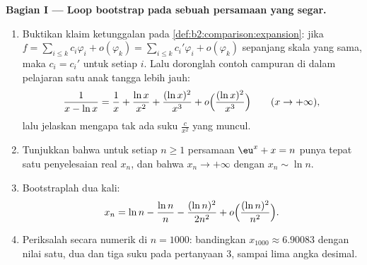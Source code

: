 \begin{problem}
\label{pb:b2:comparison:1}

\medskip
\noindent\textbf{Bagian I --- Loop bootstrap pada sebuah persamaan
yang segar.}
\begin{enumerate}
  \item Buktikan klaim ketunggalan pada
        \cref{def:b2:comparison:expansion}: jika $f = \sum_{i\leq
        k} c_i\varphi_i + o(\varphi_k) = \sum_{i \leq k}
        c_i'\varphi_i + o(\varphi_k)$ sepanjang skala yang sama, maka
        $c_i = c_i'$ untuk setiap $i$. Lalu doronglah contoh campuran
        di dalam pelajaran satu anak tangga lebih jauh:
        \[
        \frac{1}{x - \ln x} = \frac1x + \frac{\ln x}{x^2} +
        \frac{(\ln x)^2}{x^3} + o\Bigl(\frac{(\ln
        x)^2}{x^3}\Bigr) \qquad (x \to +\infty),
        \]
        lalu jelaskan mengapa tak ada suku $\frac{c}{x^2}$ yang muncul.
  \item Tunjukkan bahwa untuk setiap $n \geq 1$ persamaan $\eu^x + x =
        n$ punya tepat satu penyelesaian real $x_n$, dan bahwa $x_n
        \to +\infty$ dengan $x_n \sim \ln n$.
  \item Bootstraplah dua kali:
        \[
        x_n = \ln n - \frac{\ln n}{n} - \frac{(\ln n)^2}{2n^2} +
        o\Bigl(\frac{(\ln n)^2}{n^2}\Bigr).
        \]
  \item Periksalah secara numerik di $n = 1000$: bandingkan $x_{1000}
        \approx 6.90083$ dengan nilai satu, dua dan tiga suku
        pada pertanyaan 3, sampai lima angka desimal.
\end{enumerate}


\end{problem}
